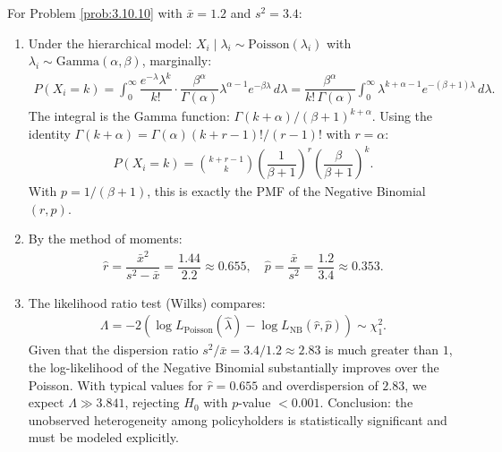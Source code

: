 \begin{solucion}
	\label{sol:3.10.10}
	For Problem \ref{prob:3.10.10} with $\bar{x} = 1.2$ and $s^{2} = 3.4$:
	\begin{enumerate}
		\item Under the hierarchical model: $X_{i} \mid \lambda_{i} \sim \text{Poisson}(\lambda_{i})$ with $\lambda_{i} \sim \text{Gamma}(\alpha, \beta)$, marginally:
		\begin{align*}
			P(X_{i} = k) = \int_{0}^{\infty} \dfrac{e^{-\lambda}\lambda^{k}}{k!} \cdot \dfrac{\beta^{\alpha}}{\Gamma(\alpha)}\lambda^{\alpha-1}e^{-\beta\lambda}\,d\lambda = \dfrac{\beta^{\alpha}}{k!\,\Gamma(\alpha)} \int_{0}^{\infty} \lambda^{k+\alpha-1} e^{-(\beta+1)\lambda}\,d\lambda.
		\end{align*}
		The integral is the Gamma function: $\Gamma(k + \alpha)/(\beta + 1)^{k+\alpha}$. Using the identity $\Gamma(k + \alpha) = \Gamma(\alpha)(k+r-1)!/(r-1)!$ with $r = \alpha$:
		\begin{align*}
			P(X_{i} = k) = \binom{k + r - 1}{k}\left(\dfrac{1}{\beta+1}\right)^{r}\left(\dfrac{\beta}{\beta+1}\right)^{k}.
		\end{align*}
		With $p = 1/(\beta+1)$, this is exactly the PMF of the Negative Binomial $(r, p)$.
		\item By the method of moments:
		\begin{align*}
			\hat{r} = \dfrac{\bar{x}^{2}}{s^{2} - \bar{x}} = \dfrac{1.44}{2.2} \approx 0.655, \quad \hat{p} = \dfrac{\bar{x}}{s^{2}} = \dfrac{1.2}{3.4} \approx 0.353.
		\end{align*}
		\item The likelihood ratio test (Wilks) compares:
		\begin{align*}
			\Lambda = -2(\log L_{\text{Poisson}}(\hat{\lambda}) - \log L_{\text{NB}}(\hat{r}, \hat{p})) \sim \chi^{2}_{1}.
		\end{align*}
		Given that the dispersion ratio $s^{2}/\bar{x} = 3.4/1.2 \approx 2.83$ is much greater than $1$, the log-likelihood of the Negative Binomial substantially improves over the Poisson. With typical values for $\hat{r} = 0.655$ and overdispersion of $2.83$, we expect $\Lambda \gg 3.841$, rejecting $H_{0}$ with $p$-value $< 0.001$. Conclusion: the unobserved heterogeneity among policyholders is statistically significant and must be modeled explicitly. \qedhere
	\end{enumerate}
\end{solucion}

